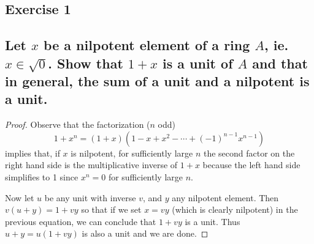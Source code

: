 \subsection*{Exercise 1}
\subsection*{%
Let $x$ be a nilpotent element of a ring $A$, ie. $x\in\sqrt{0}$. Show that $1+x$ is a unit of $A$
and that in general, the sum of a unit and a nilpotent is a unit.
} 

\begin{proof}%
Observe that the factorization ($n$ odd)
\[
	1+x^n=(1+x)(1-x+x^2-\cdots+(-1)^{n-1}x^{n-1})
\]
implies that, if $x$ is nilpotent, for sufficiently large $n$ the second factor on the right hand
side is the multiplicative inverse of $1+x$ because the left hand side simplifies to 1 since $x^n=0$
for sufficiently large $n$.

Now let $u$ be any unit with inverse $v$, and $y$ any nilpotent element. Then $v(u+y)=1+vy$ so that
if we set $x=vy$ (which is clearly nilpotent) in the previous equation, we can conclude that $1+vy$
is a unit. Thus $u+y=u(1+vy)$ is also a unit and we are done.
%
\end{proof}%

